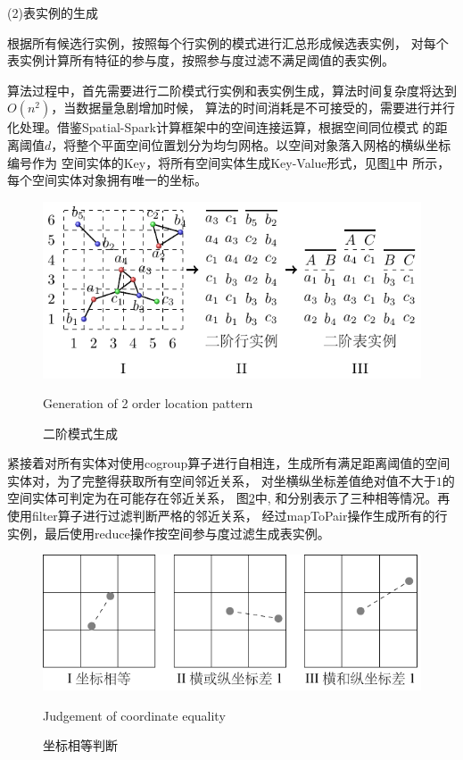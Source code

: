 (2)表实例的生成

根据所有候选行实例，按照每个行实例的模式进行汇总形成候选表实例，
对每个表实例计算所有特征的参与度，按照参与度过滤不满足阈值的表实例。

算法过程中，首先需要进行二阶模式行实例和表实例生成，算法时间复杂度将达到$O(n^2)$，当数据量急剧增加时候，
算法的时间消耗是不可接受的，需要进行并行化处理。借鉴Spatial-Spark计算框架中的空间连接运算，根据空间同位模式
的距离阈值$d$，将整个平面空间位置划分为均匀网格。以空间对象落入网格的横纵坐标编号作为
空间实体的Key，将所有空间实体生成Key-Value形式，见图\ref{fig:twoorder}中\uppercase\expandafter{}
所示，每个空间实体对象拥有唯一的坐标。
\begin{figure}
\centering
\includegraphics[width=0.8 \linewidth]{figures/two_order.pdf}
\caption{二阶模式生成}{Generation of 2 order location pattern}
\label{fig:twoorder}
\end{figure}

紧接着对所有实体对使用cogroup算子进行自相连，生成所有满足距离阈值的空间实体对，为了完整得获取所有空间邻近关系，
对坐横纵坐标差值绝对值不大于$1$的空间实体可判定为在可能存在邻近关系，
图\ref{fig:keyequal}中\uppercase\expandafter{}, \uppercase\expandafter{}
和\uppercase\expandafter{}分别表示了三种相等情况。再使用filter算子进行过滤判断严格的邻近关系，
经过mapToPair操作生成所有的行实例，最后使用reduce操作按空间参与度过滤生成表实例。
\begin{figure}
  \centering
  \includegraphics{figures/keyequal.pdf}
  \caption{坐标相等判断}{Judgement of coordinate equality}
  \label{fig:keyequal}
\end{figure}

